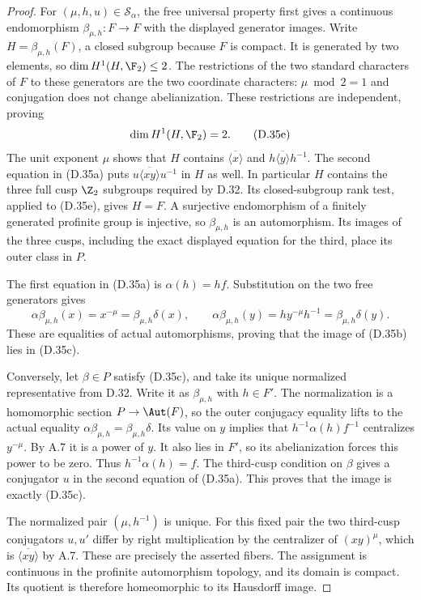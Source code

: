\begin{proof}
For $(\mu,h,u)\in\mathcal S_\alpha$, the free universal
property first gives a continuous endomorphism
$\beta_{\mu,h}:F\to F$ with the displayed generator images.
Write $H=\beta_{\mu,h}(F)$, a closed subgroup because $F$
is compact.  It is generated by two elements, so
$\dim H^1(H,\F_2)\leq2$.  The restrictions of the two
standard characters of $F$ to these generators are the
two coordinate characters: $\mu\bmod2=1$ and conjugation
does not change abelianization.  These restrictions are
independent, proving
\[
                         \dim H^1(H,\F_2)=2.                   \tag{D.35e}
\]
The unit exponent $\mu$ shows that $H$ contains
$\overline{\langle x\rangle}$ and
$h\overline{\langle y\rangle}h^{-1}$.
The second equation in (D.35a) puts
$u\overline{\langle xy\rangle}u^{-1}$ in $H$ as well.
In particular $H$ contains the three full cusp
$\Z_2$ subgroups required by D.32.  Its closed-subgroup
rank test, applied to (D.35e), gives $H=F$.
A surjective endomorphism of a finitely generated
profinite group is injective, so $\beta_{\mu,h}$ is
an automorphism.  Its images of the three cusps,
including the exact displayed equation for the third,
place its outer class in $P$.

The first equation in (D.35a) is $\alpha(h)=hf$.
Substitution on the two free generators gives
\[
 \alpha\beta_{\mu,h}(x)=x^{-\mu}
                          =\beta_{\mu,h}\delta(x),\qquad
 \alpha\beta_{\mu,h}(y)=h y^{-\mu}h^{-1}
                          =\beta_{\mu,h}\delta(y).
                                                                  \tag{D.35f}
\]
These are equalities of actual automorphisms, proving
that the image of (D.35b) lies in (D.35c).

Conversely, let $\beta\in P$ satisfy (D.35c), and take its
unique normalized representative from D.32.
Write it as $\beta_{\mu,h}$ with $h\in F'$.
The normalization is a homomorphic section
$P\to\Aut(F)$, so the outer conjugacy equality lifts
to the actual equality $\alpha\beta_{\mu,h}
=\beta_{\mu,h}\delta$.
Its value on $y$ implies that
$h^{-1}\alpha(h)f^{-1}$ centralizes $y^{-\mu}$.
By A.7 it is a power of $y$.  It also lies in $F'$,
so its abelianization forces this power to be zero.
Thus $h^{-1}\alpha(h)=f$.
The third-cusp condition on $\beta$ gives a conjugator
$u$ in the second equation of (D.35a).
This proves that the image is exactly (D.35c).

The normalized pair $(\mu,h^{-1})$ is unique.
For this fixed pair the two third-cusp conjugators
$u,u'$ differ by right multiplication by the
centralizer of $(xy)^\mu$, which is
$\overline{\langle xy\rangle}$ by A.7.
These are precisely the asserted fibers.
The assignment is continuous in the profinite
automorphism topology, and its domain is compact.
Its quotient is therefore homeomorphic to its
Hausdorff image.


\end{proof}
